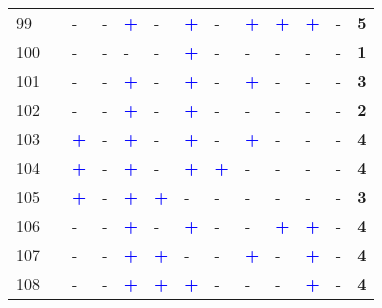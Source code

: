 \begin{longtable}{p{0.5cm}p{4.6cm}p{0.3cm}p{0.3cm}p{0.3cm}p{0.3cm}p{0.3cm}p{0.3cm}p{0.3cm}p{0.3cm}p{0.3cm}p{0.3cm}p{1cm}}
    \small{99} & \small{\textcite{kostrzewska_towards_2017}} & - & - & \textcolor{blue}{\textbf{+}} & - & \textcolor{blue}{\textbf{+}} & - & \textcolor{blue}{\textbf{+}} & \textcolor{blue}{\textbf{+}} & \textcolor{blue}{\textbf{+}} & - & \textbf{5}\\
    \small{100} & \small{\textcite{krizek_bicycling_2010}}\index{Krizek, Kevin J.|pagebf} & - & - & - & - & \textcolor{blue}{\textbf{+}} & - & - & - & - & - & \textbf{1}\\
    \small{101} & \small{\textcite{krizek_assessing_2011}}\index{Krizek, Kevin|pagebf} & - & - & \textcolor{blue}{\textbf{+}} & - & \textcolor{blue}{\textbf{+}} & - & \textcolor{blue}{\textbf{+}} & - & - & - & \textbf{3}\\
    \small{102} & \small{\textcite{krizek_detailed_2007}}\index{Krizek, Kevin J.|pagebf} & - & - & \textcolor{blue}{\textbf{+}} & - & \textcolor{blue}{\textbf{+}} & - & - & - & - & - & \textbf{2}\\
    \small{103} & \small{\textcite{krygsman_multimodal_2004}}\index{Krygsman, Stephan|pagebf} & \textcolor{blue}{\textbf{+}} & - & \textcolor{blue}{\textbf{+}} & - & \textcolor{blue}{\textbf{+}} & - & \textcolor{blue}{\textbf{+}} & - & - & - & \textbf{4}\\
    \small{104} & \small{\textcite{la_paix_puello_modelling_2015}}\index{La Paix Puello, Lissy|pagebf} & \textcolor{blue}{\textbf{+}} & - & \textcolor{blue}{\textbf{+}} & - & \textcolor{blue}{\textbf{+}} & \textcolor{blue}{\textbf{+}} & - & - & - & - & \textbf{4}\\
    \small{105} & \small{\textcite{la_paix_puello_integration_2016}}\index{La Paix Puello, Lissy|pagebf} & \textcolor{blue}{\textbf{+}} & - & \textcolor{blue}{\textbf{+}} & \textcolor{blue}{\textbf{+}} & - & - & - & - & - & - & \textbf{3}\\
    \small{106} & \small{\textcite{la_paix_puello_Train_2016}}\index{La Paix Puello, Lissy|pagebf} & - & - & \textcolor{blue}{\textbf{+}} & - & \textcolor{blue}{\textbf{+}} & - & - & \textcolor{blue}{\textbf{+}} & \textcolor{blue}{\textbf{+}} & - & \textbf{4}\\
    \small{107} & \small{\textcite{la_paix_puello_role_2021}}\index{La Paix Puello, Lissy|pagebf} & - & - & \textcolor{blue}{\textbf{+}} & \textcolor{blue}{\textbf{+}} & - & - & \textcolor{blue}{\textbf{+}} & - & \textcolor{blue}{\textbf{+}} & - & \textbf{4}\\
    \small{108} & \small{\textcite{lee_bicycle-based_2016}}\index{Lee, Jaeyeong|pagebf} & - & - & \textcolor{blue}{\textbf{+}} & \textcolor{blue}{\textbf{+}} & \textcolor{blue}{\textbf{+}} & - & - & - & \textcolor{blue}{\textbf{+}} & - & \textbf{4}\\

\end{longtable}
